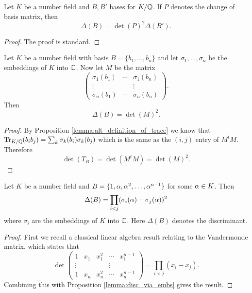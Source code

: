 \begin{lemma}\label{lem:disc_change_of_basis}
    \leanok
	Let $K$ be a number field and $B,B'$ bases for $K/\mathbb{Q}$. If $P$ denotes the change of basis matrix, then \[\Delta(B)=\det(P)^2 \Delta(B').\]
\end{lemma}
\begin{proof}
  \leanok
  The proof is standard.
\end{proof}

\begin{lemma}\label{lemma:disc_via_embs}
    \leanok
	Let $K$ be a number field with basis $B=\{b_1,\dots,b_n\}$ and let $\sigma_1,\dots,\sigma_n$ be the embeddings of $K$ into $\mathbb{C}$. Now let $M$ be the matrix  \[\left (\begin{matrix} \sigma_1(b_1) &\cdots& \sigma_1(b_n)\\ \vdots & & \vdots \\  \sigma_n(b_1) &\cdots& \sigma_n(b_n)
	\end{matrix} \right ).\] Then \[\Delta(B)=\det(M)^2.\]
\end{lemma}
\begin{proof}
    \leanok
	By Proposition \ref{lemma:alt_definition_of_trace} we know that  $\operatorname{Tr}_{K/\mathbb{Q}}(b_i b_j)= \sum_k \sigma_k(b_i)\sigma_k(b_j)$ which is the same as the $(i,j)$ entry of $M^t M$. Therefore \[\det(T_B)=\det(M^t M)=\det(M)^2.\]
\end{proof}

\begin{lemma}\label{lemma:disc_of_prim_elt_basis}
	\leanok
	Let $K$ be a number field and $B=\{1,\alpha,\alpha^2,\dots,\alpha^{n-1}\}$ for some $\alpha \in K$. Then \[\Delta(B)=\prod_{i < j} (\sigma_i(\alpha)-\sigma_j(\alpha))^2\] where $\sigma_i$ are the embeddings of $K $ into $\mathbb{C}$. Here $\Delta(B)$ denotes the discriminant.
\end{lemma}
\begin{proof}
    \leanok
	First we recall a classical linear algebra result relating to the Vandermonde matrix, which states that  \[\det \left (\begin{matrix} 1 & x_1& x_1^2&\cdots&x_1^{n-1} \\ \vdots & & & \vdots \\   1 & x_n& x_n^2&\cdots&x_n^{n-1}
	\end{matrix} \right ) =\prod_{i<j} (x_i-x_j).\] Combining this with Proposition \ref{lemma:disc_via_embs} gives the result.
\end{proof}

